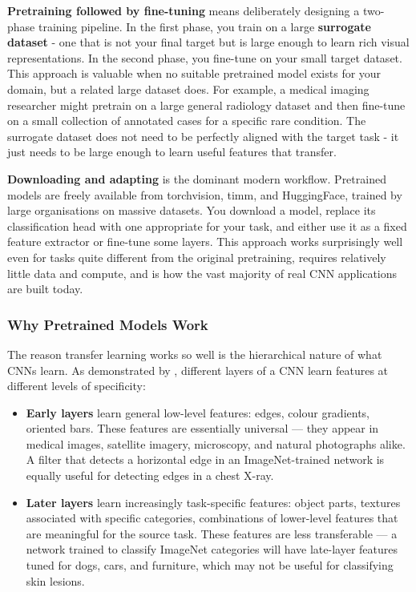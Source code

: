 \textbf{Pretraining followed by fine-tuning} means deliberately designing a two-phase training pipeline. In the first phase, you train on a large \textbf{surrogate dataset} - one that is not your final target but is large enough to learn rich visual representations. In the second phase, you fine-tune on your small target dataset. This approach is valuable when no suitable pretrained model exists for your domain, but a related large dataset does. For example, a medical imaging researcher might pretrain on a large general radiology dataset and then fine-tune on a small collection of annotated cases for a specific rare condition. The surrogate dataset does not need to be perfectly aligned with the target task - it just needs to be large enough to learn useful features that transfer.

\textbf{Downloading and adapting} is the dominant modern workflow. Pretrained models are freely available from torchvision, timm, and HuggingFace, trained by large organisations on massive datasets. You download a model, replace its classification head with one appropriate for your task, and either use it as a fixed feature extractor or fine-tune some layers. This approach works surprisingly well even for tasks quite different from the original pretraining, requires relatively little data and compute, and is how the vast majority of real CNN applications are built today.

\subsubsection{Why Pretrained Models Work}

The reason transfer learning works so well is the hierarchical nature of what CNNs learn. As demonstrated by \cite{Zeiler2014}, different layers of a CNN learn features at different levels of specificity:

\begin{itemize}
    \item \textbf{Early layers} learn general low-level features: edges, colour gradients, oriented bars. These features are essentially universal — they appear in medical images, satellite imagery, microscopy, and natural photographs alike. A filter that detects a horizontal edge in an ImageNet-trained network is equally useful for detecting edges in a chest X-ray.
    \item \textbf{Later layers} learn increasingly task-specific features: object parts, textures associated with specific categories, combinations of lower-level features that are meaningful for the source task. These features are less transferable — a network trained to classify ImageNet categories will have late-layer features tuned for dogs, cars, and furniture, which may not be useful for classifying skin lesions.
\end{itemize}

